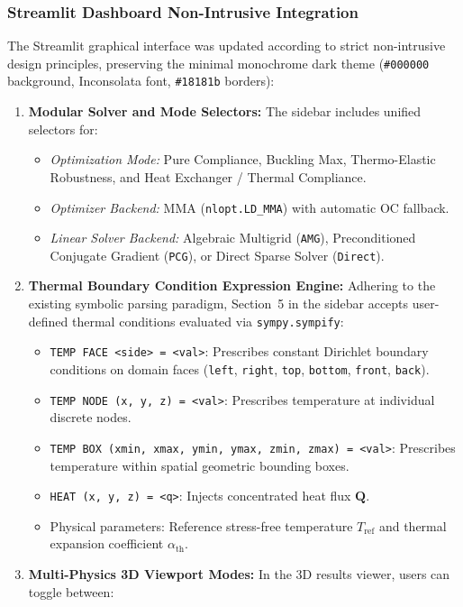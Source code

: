 \documentclass[11pt, a4paper]{article}
\begin{document}
\subsubsection{Streamlit Dashboard Non-Intrusive Integration}
The Streamlit graphical interface was updated according to strict non-intrusive design principles, preserving the minimal monochrome dark theme (\texttt{\#000000} background, Inconsolata font, \texttt{\#18181b} borders):
\begin{enumerate}
    \item \textbf{Modular Solver and Mode Selectors:} The sidebar includes unified selectors for:
    \begin{itemize}
        \item \textit{Optimization Mode:} Pure Compliance, Buckling Max, Thermo-Elastic Robustness, and Heat Exchanger / Thermal Compliance.
        \item \textit{Optimizer Backend:} MMA (\texttt{nlopt.LD\_MMA}) with automatic OC fallback.
        \item \textit{Linear Solver Backend:} Algebraic Multigrid (\texttt{AMG}), Preconditioned Conjugate Gradient (\texttt{PCG}), or Direct Sparse Solver (\texttt{Direct}).
    \end{itemize}
    \item \textbf{Thermal Boundary Condition Expression Engine:} Adhering to the existing symbolic parsing paradigm, Section~5 in the sidebar accepts user-defined thermal conditions evaluated via \texttt{sympy.sympify}:
    \begin{itemize}
        \item \texttt{TEMP FACE <side> = <val>}: Prescribes constant Dirichlet boundary conditions on domain faces (\texttt{left}, \texttt{right}, \texttt{top}, \texttt{bottom}, \texttt{front}, \texttt{back}).
        \item \texttt{TEMP NODE (x, y, z) = <val>}: Prescribes temperature at individual discrete nodes.
        \item \texttt{TEMP BOX (xmin, xmax, ymin, ymax, zmin, zmax) = <val>}: Prescribes temperature within spatial geometric bounding boxes.
        \item \texttt{HEAT (x, y, z) = <q>}: Injects concentrated heat flux $\mathbf{Q}$.
        \item Physical parameters: Reference stress-free temperature $T_{\text{ref}}$ and thermal expansion coefficient $\alpha_{\text{th}}$.
    \end{itemize}
    \item \textbf{Multi-Physics 3D Viewport Modes:} In the 3D results viewer, users can toggle between:

\end{enumerate}
\end{document}
